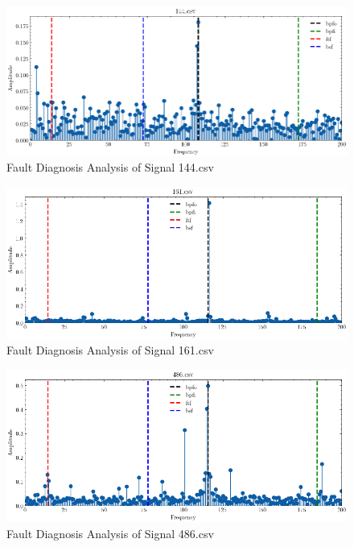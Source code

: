 \documentclass[conference]{IEEEtran}
\begin{document}
\begin{figure}[htbp]
    \centerline{\includegraphics[width=\textwidth]{figure/fig_8.png}}
    \caption{Fault Diagnosis Analysis of Signal 144.csv}
    \label{fig_8}
\end{figure}

\begin{figure}[htbp]
    \centerline{\includegraphics[width=\textwidth]{figure/fig_14.png}}
    \caption{Fault Diagnosis Analysis of Signal 161.csv}
    \label{fig_14}
\end{figure}

\begin{figure}[htbp]
    \centerline{\includegraphics[width=\textwidth]{figure/fig_9.png}}
    \caption{Fault Diagnosis Analysis of Signal 486.csv}
    \label{fig_9}
\end{figure}
\end{document}
